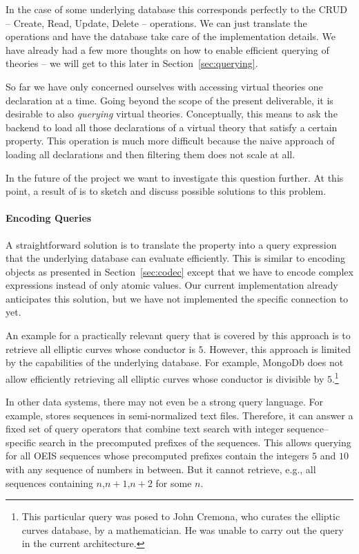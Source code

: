 In the case of some underlying database
this corresponds perfectly to the CRUD -- Create, Read, Update, Delete -- operations.
We can
just translate the operations and have the database take care of the implementation details. We
have already had a few more thoughts on how to enable efficient querying of theories -- we will
get to this later in Section~\ref{sec:querying}.

So far we have only concerned ourselves with accessing virtual theories one declaration at a time.
Going beyond the scope of the present deliverable, it is desirable to also \emph{querying} virtual theories.
Conceptually, this means to ask the \MMT backend to load all those declarations of a virtual theory that satisfy a certain property.
This operation is much more difficult because the naive approach of loading all declarations and then filtering them does not scale at all.

In the future of the \pn project we want to investigate this question further.
At this point, a result of \pn is to sketch and discuss possible solutions to this problem.

\paragraph{Encoding Queries}
A straightforward solution is to translate the property into a query expression that the underlying database can evaluate efficiently.
This is similar to encoding objects as presented in Section~\ref{sec:codec} except that we have to encode complex expressions instead of only atomic values.
Our current implementation already anticipates this solution, but we have not implemented the specific connection to \LMFDB yet.

An example for a practically relevant query that is covered by this approach is to retrieve all elliptic curves whose conductor is $5$.
However, this approach is limited by the capabilities of the underlying database.
For example, MongoDb does not allow efficiently retrieving all elliptic curves whose conductor is divisible by $5$.\footnote{This particular query was posed to John Cremona, who curates the elliptic curves database, by a mathematician. He was unable to carry out the query in the current architecture.}

In other data systems, there may not even be a strong query language.
For example, \OEIS stores sequences in semi-normalized text files.
Therefore, it can answer a fixed set of query operators that combine text search with integer sequence--specific search in the precomputed prefixes of the sequences.
This allows querying for all OEIS sequences whose precomputed prefixes contain the integers $5$ and $10$ with any sequence of numbers in between.
But it cannot retrieve, e.g., all sequences containing $n$,$n+1$,$n+2$ for some $n$.

